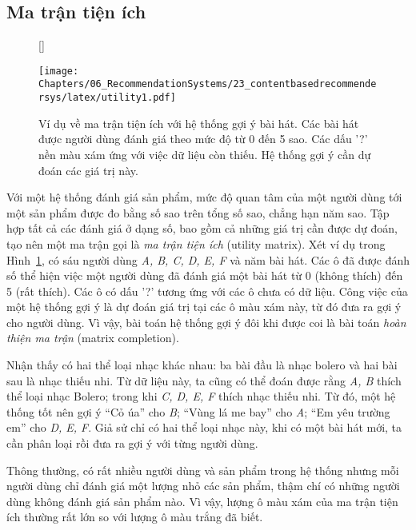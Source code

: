 \subsection{Ma trận tiện ích}

\begin{figure}[t]
[\FBwidth]
{\caption{
Ví dụ về ma trận tiện ích với hệ thống gợi ý bài hát. Các bài hát được người dùng đánh giá theo mức độ từ 0
đến 5 sao. Các dấu '?' nền màu xám ứng với việc dữ liệu còn thiếu. Hệ thống gợi ý cần dự đoán các giá trị này.
}
\label{fig:23_1}}
{ %
\texttt{[image: Chapters/06\_RecommendationSystems/23\_contentbasedrecommendersys/latex/utility1.pdf]}
}
\end{figure}

Với một hệ thống đánh giá sản phẩm, {mức độ quan tâm} của một người dùng
tới một sản phẩm được đo bằng số sao trên tổng số sao, chẳng hạn năm sao. Tập hợp tất cả các đánh giá ở dạng số, bao gồm cả những giá trị cần được dự đoán, tạo nên
một ma trận gọi là \textit{ma trận tiện ích} (utility matrix). Xét ví dụ trong
Hình~\ref{fig:23_1}, có sáu người dùng \textit{A, B, C, D, E, F} và
năm bài hát. Các ô đã được đánh số thể hiện việc một người dùng đã đánh giá
một bài hát từ 0 (không thích) đến 5 (rất thích). Các ô có
dấu '?' tương ứng với các ô chưa có dữ liệu. Công việc của một
hệ thống gợi ý là dự đoán giá trị tại các ô màu xám này, từ đó đưa ra gợi
ý cho người dùng. Vì vậy, bài toán hệ thống gợi ý đôi khi được coi là
bài toán \textit{hoàn thiện ma trận} ({matrix completion}).

Nhận thấy có hai thể loại nhạc khác nhau: ba bài
đầu là nhạc {bolero} và hai bài sau là nhạc {thiếu nhi}. Từ dữ
liệu này, ta cũng có thể đoán được rằng \textit{A, B} thích thể loại nhạc
{Bolero}; trong khi \textit{C, D, E, F} thích nhạc {thiếu
nhi}. Từ đó, một hệ thống tốt nên gợi ý ``{Cỏ úa}'' cho \textit{B};
``{Vùng lá me bay}'' cho \textit{A}; ``{Em yêu trường em}'' cho \textit{D,
E, F}. Giả sử chỉ có hai thể loại nhạc này, khi có một bài hát mới, ta cần
phân loại rồi đưa ra gợi ý với từng người dùng.

Thông thường, có rất nhiều người dùng và sản phẩm trong hệ thống nhưng mỗi
người dùng chỉ đánh giá một lượng nhỏ các sản phẩm,
thậm chí có những người dùng không đánh giá sản phẩm nào. Vì vậy, lượng ô
màu xám của ma trận tiện ích thường rất lớn so với lượng ô màu trắng đã biết.


